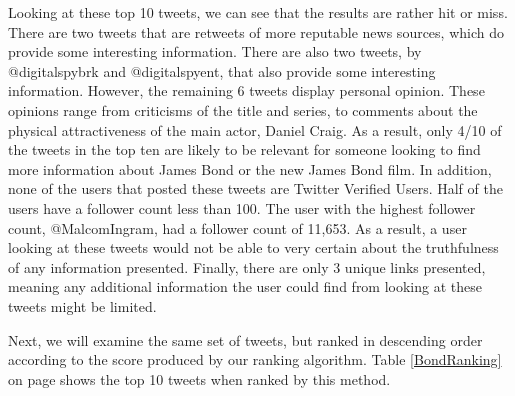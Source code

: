 \documentclass[10pt]{proc}
\begin{document}
    Looking at these top 10 tweets, we can see that the results are rather hit or miss. There are two tweets that are retweets of more reputable news sources, which do provide some interesting information. There are also two tweets, by @digitalspybrk and @digitalspyent, that also provide some interesting information. However, the remaining 6 tweets display personal opinion. These opinions range from criticisms of the title and series, to comments about the physical attractiveness of the main actor, Daniel Craig. As a result, only 4/10 of the tweets in the top ten are likely to be relevant for someone looking to find more information about James Bond or the new James Bond film. In addition, none of the users that posted these tweets are Twitter Verified Users. Half of the users have a follower count less than 100. The user with the highest follower count, @MalcomIngram, had a follower count of 11,653. As a result, a user looking at these tweets would not be able to very certain about the truthfulness of any information presented. Finally, there are only 3 unique links presented, meaning any additional information the user could find from looking at these tweets might be limited.

    Next, we will examine the same set of tweets, but ranked in descending order according to the score produced by our ranking algorithm. Table \ref{BondRanking} on page \pageref{BondRanking} shows the top 10 tweets when ranked by this method.
\end{document}
